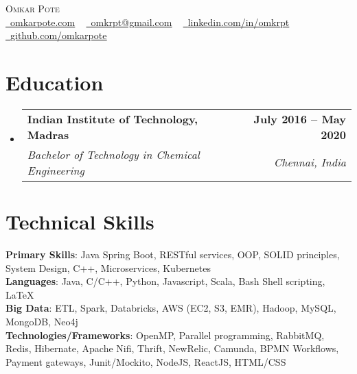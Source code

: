 \documentclass[letterpaper,11pt]{article}
\makeatletter
\newcommand{\resumeSubheading}[4]{
  \vspace{-2pt}\item
    \begin{tabular*}{1.0\textwidth}[t]{l@{\extracolsep{\fill}}r}
      \textbf{#1} & \textbf{\small #2} \\
      \textit{\small#3} & \textit{\small #4} \\
    \end{tabular*}\vspace{-7pt}
}
\newcommand{\resumeSubHeadingListStart}{\begin{itemize}[leftmargin=0.0in, label={}]}
\newcommand{\resumeSubHeadingListEnd}{\end{itemize}}
\makeatother
\begin{document}

\begin{center}
    {\vspace*{30pt} \Huge \scshape Omkar Pote} \\ \vspace{5pt} 
    \small
    \href{omkarpote.com}{\raisebox{-0.2\height}\faGlobe\  \underline{omkarpote.com}} ~ 
    \href{mailto:omkrpt@gmail.com}{\raisebox{-0.2\height}\faEnvelope\  \underline{omkrpt@gmail.com}} ~ 
    \href{https://linkedin.com/in/omkrpt/}{\raisebox{-0.2\height}\faLinkedin\ \underline{linkedin.com/in/omkrpt}}  ~
    \href{https://github.com/omkarpote}{\raisebox{-0.2\height}\faGithub\ \underline{github.com/omkarpote}}
    \vspace{-8pt}
\end{center}


\section{Education}
  \resumeSubHeadingListStart
    \resumeSubheading
      {Indian Institute of Technology, Madras}{July 2016 -- May 2020}
      {Bachelor of Technology in Chemical Engineering}{Chennai, India}
  \resumeSubHeadingListEnd

\section{Technical Skills}
 \begin{itemize}[leftmargin=0.15in, label={}]
    \small{\item{
     \textbf{Primary Skills}{: Java Spring Boot, RESTful services, OOP, SOLID principles, System Design, C++, Microservices, Kubernetes} \\
     \textbf{Languages}{: Java, C/C++, Python, Javascript, Scala, Bash Shell scripting, LaTeX} \\
     \textbf{Big Data}{: ETL, Spark, Databricks, AWS (EC2, S3, EMR), Hadoop, MySQL, MongoDB, Neo4j} \\
     \textbf{Technologies/Frameworks}{: OpenMP, Parallel programming, RabbitMQ, Redis, Hibernate, Apache Nifi, Thrift, NewRelic, Camunda, BPMN Workflows, Payment gateways, Junit/Mockito, NodeJS, ReactJS, HTML/CSS} \\
    }}
 \end{itemize}
 \vspace{-16pt}
\end{document}
